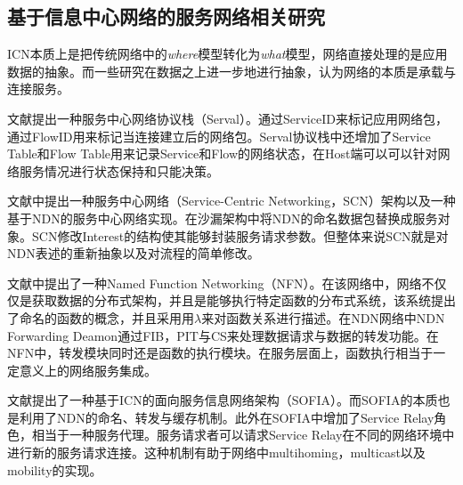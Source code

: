\subsection{基于信息中心网络的服务网络相关研究}
\label{SCN-intro}
ICN本质上是把传统网络中的\textit{where}模型转化为\textit{what}模型，网络直接处理的是应用数据的抽象。而一些研究在数据之上进一步地进行抽象，认为网络的本质是承载与连接服务。

文献\cite{nordstrom2012serval}提出一种服务中心网络协议栈（Serval）。通过ServiceID来标记应用网络包，通过FlowID用来标记当连接建立后的网络包。Serval协议栈中还增加了Service Table和Flow Table用来记录Service和Flow的网络状态，在Host端可以可以针对网络服务情况进行状态保持和只能决策。

文献\cite{braun2011service,braun2013service}中提出一种服务中心网络（Service-Centric Networking，SCN）架构以及一种基于NDN的服务中心网络实现。在沙漏架构中将NDN的命名数据包替换成服务对象。SCN修改Interest的结构使其能够封装服务请求参数。但整体来说SCN就是对NDN表述的重新抽象以及对流程的简单修改。

文献\cite{tschudin2014named}中提出了一种Named Function Networking（NFN）。在该网络中，网络不仅仅是获取数据的分布式架构，并且是能够执行特定函数的分布式系统，该系统提出了命名的函数的概念，并且采用用$\lambda$来对函数关系进行描述。在NDN网络中NDN Forwarding Deamon通过FIB，PIT与CS来处理数据请求与数据的转发功能。在NFN中，转发模块同时还是函数的执行模块。在服务层面上，函数执行相当于一定意义上的网络服务集成。

文献\cite{wu2014sofia}提出了一种基于ICN的面向服务信息网络架构（SOFIA）。而SOFIA的本质也是利用了NDN的命名、转发与缓存机制。此外在SOFIA中增加了Service Relay角色，相当于一种服务代理。服务请求者可以请求Service Relay在不同的网络环境中进行新的服务请求连接。这种机制有助于网络中multihoming，multicast以及mobility的实现。
